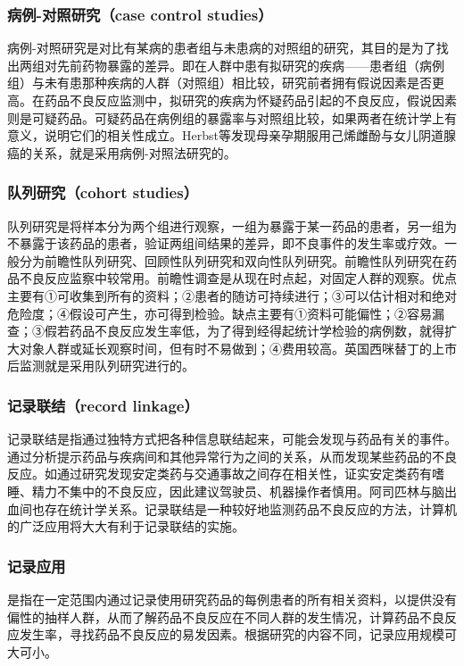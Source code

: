 \subsubsection{病例-对照研究（case control studies）}

病例-对照研究是对比有某病的患者组与未患病的对照组的研究，其目的是为了找出两组对先前药物暴露的差异。即在人群中患有拟研究的疾病------患者组（病例组）与未有患那种疾病的人群（对照组）相比较，研究前者拥有假说因素是否更高。在药品不良反应监测中，拟研究的疾病为怀疑药品引起的不良反应，假说因素则是可疑药品。可疑药品在病例组的暴露率与对照组比较，如果两者在统计学上有意义，说明它们的相关性成立。Herbst等发现母亲孕期服用己烯雌酚与女儿阴道腺癌的关系，就是采用病例-对照法研究的。

\subsubsection{队列研究（cohort studies）}

队列研究是将样本分为两个组进行观察，一组为暴露于某一药品的患者，另一组为不暴露于该药品的患者，验证两组间结果的差异，即不良事件的发生率或疗效。一般分为前瞻性队列研究、回顾性队列研究和双向性队列研究。前瞻性队列研究在药品不良反应监察中较常用。前瞻性调查是从现在时点起，对固定人群的观察。优点主要有①可收集到所有的资料；②患者的随访可持续进行；③可以估计相对和绝对危险度；④假设可产生，亦可得到检验。缺点主要有①资料可能偏性；②容易漏查；③假若药品不良反应发生率低，为了得到经得起统计学检验的病例数，就得扩大对象人群或延长观察时间，但有时不易做到；④费用较高。英国西咪替丁的上市后监测就是采用队列研究进行的。

\subsubsection{记录联结（record linkage）}

记录联结是指通过独特方式把各种信息联结起来，可能会发现与药品有关的事件。通过分析提示药品与疾病间和其他异常行为之间的关系，从而发现某些药品的不良反应。如通过研究发现安定类药与交通事故之间存在相关性，证实安定类药有嗜睡、精力不集中的不良反应，因此建议驾驶员、机器操作者慎用。阿司匹林与脑出血间也存在统计学关系。记录联结是一种较好地监测药品不良反应的方法，计算机的广泛应用将大大有利于记录联结的实施。

\subsubsection{记录应用}

是指在一定范围内通过记录使用研究药品的每例患者的所有相关资料，以提供没有偏性的抽样人群，从而了解药品不良反应在不同人群的发生情况，计算药品不良反应发生率，寻找药品不良反应的易发因素。根据研究的内容不同，记录应用规模可大可小。


